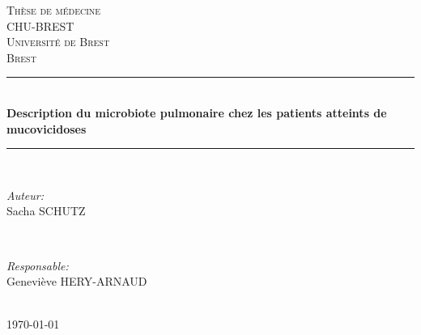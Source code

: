 \documentclass[12pt,a4paper]{article}
\newcommand{\HRule}{\rule{\linewidth}{0.5mm}} %
\begin{document}
\begin{titlepage}
\center







\textsc{\LARGE Thèse de médecine}\\[1.5cm]
\textsc{\Large CHU-BREST}\\[0.5cm]
\textsc{\large Université de Brest\\
Brest \
}\\[0.5cm]
 
\HRule \\[0.8cm]

{ \huge \bfseries Description du microbiote pulmonaire chez les patients atteints de mucovicidoses}\\[0.4cm]

\HRule \\[1.2cm]
 
\begin{minipage}{0.4\textwidth}
 \begin{flushleft} \large
     \emph{Auteur:}\\
     Sacha SCHUTZ
 \end{flushleft}
\end{minipage}
~
\begin{minipage}{0.4\textwidth}
 \begin{flushright} \large
     \emph{Responsable:} \\
     Geneviève HERY-ARNAUD
 \end{flushright}
\end{minipage}\\[2cm]
 
{\large \today}\\[8cm] %
 

\end{titlepage}
\end{document}
